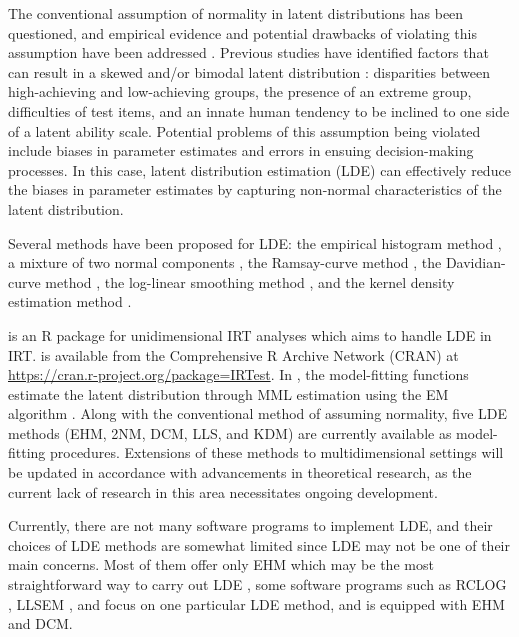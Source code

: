 The conventional assumption of normality in latent distributions has been
questioned, and empirical evidence and potential drawbacks
of violating this assumption have been addressed \citep{Dudley-Marling:2020, Li:2022, Mislevy:1984, Sass+Schmitt+Walker:2008, Seong:1990, Woods+Lin:2009}. Previous studies have identified factors that can
result in a skewed and/or bimodal latent distribution
\citep{Harvey+Murray:1994, Ho+Yu:2015, Woods:2015, Yadin:2013}:
disparities between high-achieving and low-achieving groups, the
presence of an extreme group, difficulties of test items, and an innate
human tendency to be inclined to one side of a latent ability scale.
Potential problems of this assumption being violated include
biases in parameter estimates and errors in ensuing decision-making
processes. In this case, latent distribution estimation (LDE) can
effectively reduce the biases in parameter estimates by capturing
non-normal characteristics of the latent distribution.

Several methods have been proposed for LDE:
the empirical histogram method \citep[EHM:][]{Bock+Aitkin:1981, Mislevy:1984},
a mixture of two normal components \citep[2NM:][]{Li:2021, Mislevy:1984},
the Ramsay-curve method \citep[RCM:][]{Woods:2006}, the Davidian-curve method \citep[DCM:][]{Woods+Lin:2009},
the log-linear smoothing method \citep[LLS:][]{Casabianca+Lewis:2015, Xu+vonDavier:2008},
and the kernel density estimation method \citep[KDM:][]{Li:2022}.

 is an R package for unidimensional IRT analyses which aims
to handle LDE in IRT.  is available from the
Comprehensive R Archive Network (CRAN) at
\url{https://cran.r-project.org/package=IRTest}. In ,
the model-fitting functions estimate the latent distribution through
MML estimation using the EM algorithm \citep[MML-EM:][]{Bock+Aitkin:1981}. Along with the
conventional method of assuming normality, five LDE methods
(EHM, 2NM, DCM, LLS, and KDM) are currently available as model-fitting procedures.
Extensions of these methods to multidimensional settings will be updated in accordance with
advancements in theoretical research, as the current lack of research
in this area necessitates ongoing development.

Currently, there are not many software programs to implement LDE,
and their choices of LDE methods are somewhat limited since LDE may
not be one of their main concerns. Most of them offer only EHM which
may be the most straightforward way to carry out LDE \citetext{\citealp[e.g.,
BILOG-MG,][]{BILOG-MG}; \citealp[flexMIRT,][]{flexMIRT}}, some software
programs such as RCLOG \citep{RCLOG}, LLSEM \citep{LLSEM}, and  \citep{sirt} focus on one
particular LDE method, and  \citep{mirt} is equipped with
EHM and DCM.

